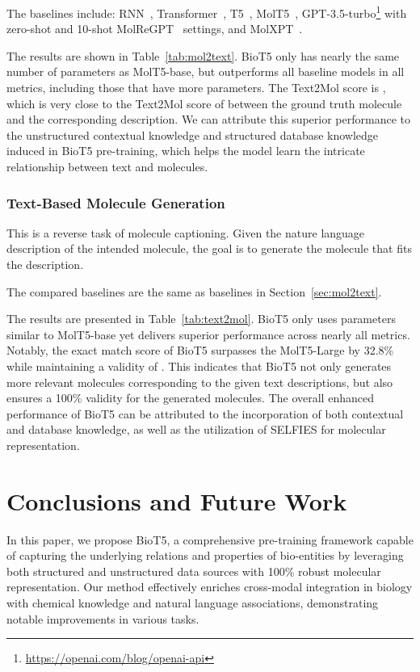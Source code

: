 \documentclass[11pt]{article}
\newcommand{\method}{{BioT5}}
\begin{document}
The baselines include:
RNN~\citep{medsker2001recurrent}, Transformer~\citep{vaswani2017attention}, T5~\citep{raffel2020exploring}, MolT5~\citep{DBLP:conf/emnlp/EdwardsLRHCJ22}, GPT-3.5-turbo\footnote{\url{https://openai.com/blog/openai-api}} with zero-shot and 10-shot MolReGPT~\citep{li2023empowering} settings, and MolXPT~\cite{liu2023molxpt}.

The results are shown in Table~\ref{tab:mol2text}.
\method{} only has nearly the same number of parameters as MolT5-base, but outperforms all baseline models in all metrics, including those that have more parameters.
The Text2Mol score is , which is very close to the Text2Mol score of  between the ground truth molecule and the corresponding description.
We can attribute this superior performance to the unstructured contextual knowledge and structured database knowledge induced in \method{} pre-training, which helps the model learn the intricate relationship between text and molecules. 

\subsubsection{Text-Based Molecule Generation}
\label{sec:text2mol}
This is a reverse task of molecule captioning.
Given the nature language description of the intended molecule, the goal is to generate the molecule that fits the description.

The compared baselines are the same as baselines in Section~\ref{sec:mol2text}.

The results are presented in Table~\ref{tab:text2mol}.
\method{} only uses parameters similar to MolT5-base yet delivers superior performance across nearly all metrics.
Notably, the exact match score of \method{} surpasses the MolT5-Large by 32.8\% while maintaining a validity of .
This indicates that \method{} not only generates more relevant molecules corresponding to the given text descriptions, but also ensures a 100\% validity for the generated molecules.
The overall enhanced performance of \method{} can be attributed to the incorporation of both contextual and database knowledge, as well as the utilization of SELFIES for molecular representation.

\section{Conclusions and Future Work}
In this paper, we propose \method{}, a comprehensive pre-training framework capable of capturing the underlying relations and properties of bio-entities by leveraging both structured and unstructured data sources with 100\% robust molecular representation. 
Our method effectively enriches cross-modal integration in biology with chemical knowledge and natural language associations, demonstrating notable improvements in various tasks.
\end{document}
